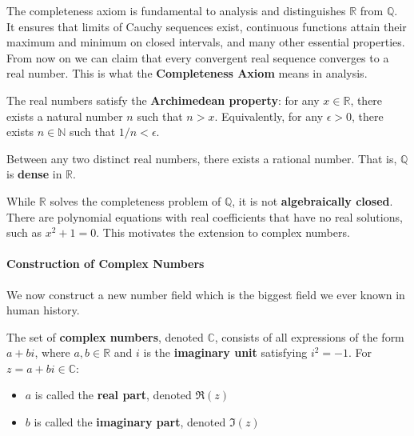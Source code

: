The completeness axiom is fundamental to analysis and distinguishes $\mathbb{R}$ from $\mathbb{Q}$. It ensures that limits of Cauchy sequences exist, continuous functions attain their maximum and minimum on closed intervals, and many other essential properties. From now on we can claim that every convergent real sequence converges to a real number. This is what the \textbf{Completeness Axiom} means in analysis.

\begin{definition}
The real numbers satisfy the \textbf{Archimedean property}: for any $x \in \mathbb{R}$, there exists a natural number $n$ such that $n > x$. Equivalently, for any $\epsilon > 0$, there exists $n \in \mathbb{N}$ such that $1/n < \epsilon$.
\end{definition}

\begin{theorem}
Between any two distinct real numbers, there exists a rational number. That is, $\mathbb{Q}$ is \textbf{dense} in $\mathbb{R}$.
\end{theorem}

While $\mathbb{R}$ solves the completeness problem of $\mathbb{Q}$, it is not \textbf{algebraically closed}. There are polynomial equations with real coefficients that have no real solutions, such as $x^2 + 1 = 0$. This motivates the extension to complex numbers.

\newpage

\paragraph{Construction of Complex Numbers}

We now construct a new number field which is the biggest field we ever known in human history.

\begin{definition}
The set of \textbf{complex numbers}, denoted $\mathbb{C}$, consists of all expressions of the form $a + bi$, where $a, b \in \mathbb{R}$ and $i$ is the \textbf{imaginary unit} satisfying $i^2 = -1$. For $z = a + bi \in \mathbb{C}$:
\begin{itemize}
    \item $a$ is called the \textbf{real part}, denoted $\Re(z)$
    \item $b$ is called the \textbf{imaginary part}, denoted $\Im(z)$
\end{itemize}
\end{definition}

